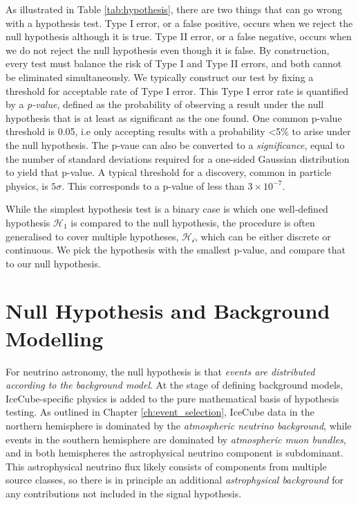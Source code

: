 As illustrated in Table \ref{tab:hypothesis}, there are two things that can go wrong with a hypothesis test. Type I error, or a false positive, occurs when we reject the null hypothesis although it is true. Type II error, or a false negative, occurs when we do not reject the null hypothesis even though it is false. By construction, every test must balance the risk of Type I and Type II errors, and both cannot be eliminated simultaneously. We typically construct our test by fixing a threshold for acceptable rate of Type I error. This Type I error rate is quantified by a \emph{p-value}, defined as the probability of observing a result under the null hypothesis that is at least as significant as the one found. One common p-value threshold is 0.05, i.e only accepting results with a probability <5\% to arise under the null hypothesis. The p-vaue can also be converted to a \emph{significance}, equal to the number of standard deviations required for a one-sided Gaussian distribution to yield that p-value. A typical threshold for a discovery, common in particle physics, is $5 \sigma$. This corresponds to a p-value of less than $3 \times 10^{-7}$.

While the simplest hypothesis test is a binary case is which one well-defined hypothesis $\mathcal{H_{1}}$ is compared to the null hypothesis, the procedure is often generalised to cover multiple hypotheses, $\mathcal{H_{i}}$, which can be either discrete or continuous. We pick the hypothesis with the smallest p-value, and compare that to our null hypothesis.

\section{Null Hypothesis and Background Modelling}
\label{sec:background}

For neutrino astronomy, the null hypothesis is that \emph{events are distributed according to the background model}. At the stage of defining background models, IceCube-specific physics is added to the pure mathematical basis of hypothesis testing. As outlined in Chapter \ref{ch:event_selection}, IceCube data in the northern hemisphere is dominated by the \emph{atmospheric neutrino background}, while events in the southern hemisphere are dominated by \emph{atmospheric muon bundles}, and in both hemispheres the astrophysical neutrino component is subdominant. This astrophysical neutrino flux likely consists of components from multiple source classes, so there is in principle an additional \emph{astrophysical background} for any contributions not included in the signal hypothesis.

